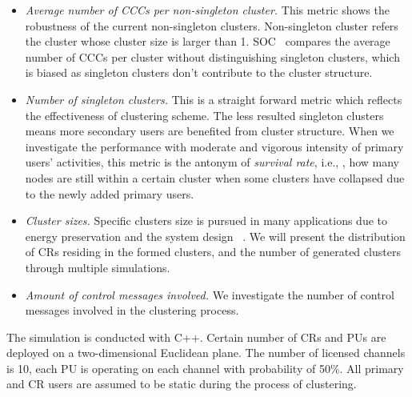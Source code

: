 \documentclass[10pt,journal,compsoc]{IEEEtran}
\theoremstyle{mytheoremstyle}
\theoremstyle{mytheoremstyle}
\theoremstyle{mytheoremstyle}
\newcommand{\eg}{e.g., }
\newcommand{\ie}{i.e., }
\begin{document}
\begin{itemize}
\item \textit{Average number of CCCs per non-singleton cluster.}
This metric shows the robustness of the current non-singleton clusters.
Non-singleton cluster refers the cluster whose cluster size is larger than 1.
SOC~\cite{Lazos09} compares the average number of CCCs per cluster without distinguishing singleton clusters, which is biased as singleton clusters don't contribute to the cluster structure.


\item \textit{Number of singleton clusters.}
This is a straight forward metric which reflects the effectiveness of clustering scheme.
The less resulted singleton clusters means more secondary users are benefited from cluster structure.
When we investigate the performance with moderate and vigorous intensity of primary users' activities, this metric is the antonym of \textit{survival rate}, \ie, how many nodes are still within a certain cluster when some clusters have collapsed due to the newly added primary users.



\item \textit{Cluster sizes.}
Specific clusters size is pursued in many applications due to energy preservation and the system design ~\cite{clustering_globecom11}.
We will present the distribution of CRs residing in the formed clusters, and the number of generated clusters through multiple simulations.

\item \textit{Amount of control messages involved.}
We investigate the number of control messages involved in the clustering process.

\end{itemize}

The simulation is conducted with C++. 
Certain number of CRs and PUs are deployed on a two-dimensional Euclidean plane.
The number of licensed channels is 10, each PU is operating on each channel with probability of 50\%.
All primary and CR users are assumed to be static during the process of clustering.
\end{document}
